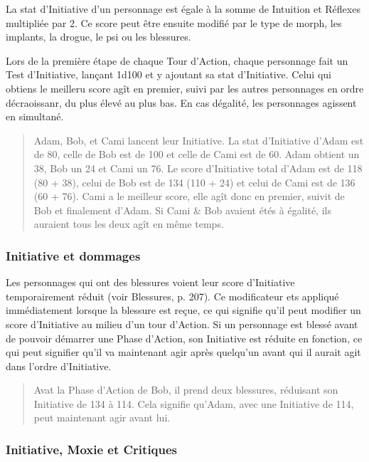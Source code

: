 La stat d'Initiative d'un personnage est égale à la somme de Intuition et Réflexes multipliée par 2. Ce score peut être ensuite modifié par le type de morph, les implants, la drogue, le psi ou les blessures. 

Lors de la première étape de chaque Tour d'Action, chaque personnage fait un Test d'Initiative, lançant 1d100 et y ajoutant sa stat d'Initiative. Celui qui obtiens le meilleru score agît en premier, suivi par les autres personnages en ordre décraoissanr, du plus élevé au plus bas. En cas dégalité, les personnages agissent en simultané. 

\begin{quotation} Adam, Bob, et Cami lancent leur Initiative. La stat d'Initiative d'Adam est de 80, celle de Bob est de 100 et celle de Cami est de 60. Adam obtient un 38, Bob un 24 et Cami un 76. Le score d'Initiative total d'Adam est de 118 (80 + 38), celui de Bob est de 134 (110 + 24) et celui de Cami est de 136 (60 + 76). Cami a le meilleur score, elle agît donc en premier, suivit de Bob et finalement d'Adam. Si Cami \& Bob avaient étés à égalité, ils auraient tous les deux agît en même temps. \end{quotation} 

\subsubsection{Initiative et dommages} 

Les personnages qui ont des blessures voient leur score d'Initiative temporairement réduit (voir Blessures, p. 207). Ce modificateur ets appliqué immédiatement lorsque la blessure est reçue, ce qui signifie qu'il peut modifier un score d'Initiative au milieu d'un tour d'Action. Si un personnage est blessé avant de pouvoir démarrer une Phase d'Action, son Initiative est réduite en fonction, ce qui peut signifier qu'il va maintenant agir après quelqu'un avant qui il aurait agit dans l'ordre d'Initiative. 

\begin{quotation} Avat la Phase d'Action de Bob, il prend deux blessures, réduisant son Initiative de 134 à 114. Cela signifie qu'Adam, avec une Initiative de 114, peut maintenant agir avant lui. \end{quotation} 

\subsubsection{Initiative, Moxie et Critiques} 


